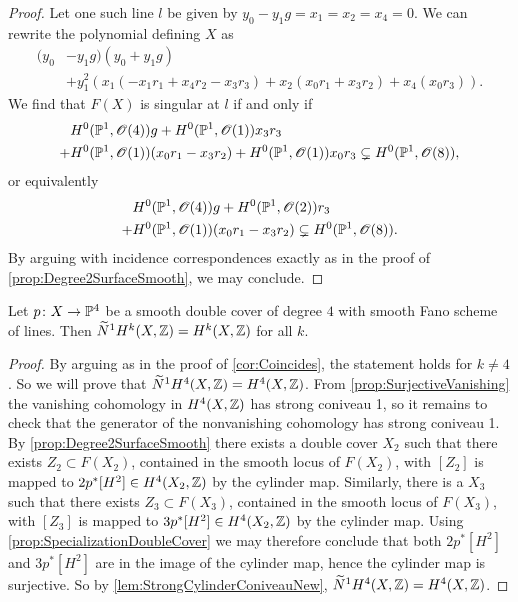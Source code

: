 \begin{proof}
Let one such line $l$ be given by
$y_0-y_1g=x_1 = x_2 = x_4= 0$. We can rewrite the polynomial defining $X$ as
\begin{equation}
  \label{eq:CubicScroll2DoubleCover}
  \begin{split}
(y_0&- y_1g)(y_0 + y_1g)
 \\ &+y_1^2\left(x_1(-x_1r_1 + x_4r_2 - x_3r_3)
+ x_2(x_0r_1 + x_3r_2) 
+ x_4(x_0 r_3)\right). 
  \end{split}
\end{equation}
We find that $F(X)$ is singular at $l$ if and only if
\begin{equation}
  \begin{split}
&H^0(\mathbb{P}^1,\mathscr{O}(4))g + H^0(\mathbb{P}^1,\mathscr{O}(1))x_3r_3\\
+&H^0(\mathbb{P}^1,\mathscr{O}(1))(x_0r_1 - x_3r_2)+H^0(\mathbb{P}^1,\mathscr{O}(1))x_0r_3  \subsetneq H^0(\mathbb{P}^1,\mathscr{O}(8)),\\
  \end{split}
\end{equation}
or equivalently
\begin{equation}
  \label{eq:CubicScroll3DoubleCover}
  \begin{split}
&H^0(\mathbb{P}^1,\mathscr{O}(4))g + H^0(\mathbb{P}^1,\mathscr{O}(2))r_3\\
+ &H^0(\mathbb{P}^1,\mathscr{O}(1))(x_0r_1 - x_3r_2)  \subsetneq H^0(\mathbb{P}^1,\mathscr{O}(8)).
\end{split}
\end{equation}
By arguing with incidence correspondences exactly as in the proof of \cref{prop:Degree2SurfaceSmooth}, we may conclude.
\end{proof}

\begin{theorem}
\label{thm:Degree4Fourfolds}
  Let $p \colon X \to \mathbb{P}^4$ be a smooth double cover of degree $4$ with smooth Fano scheme of lines. Then $\widetilde{N}^1H^k(X,\mathbb{Z}) = H^k(X,\mathbb{Z})$ for all $k$.
\end{theorem}
\begin{proof}
By arguing as in the proof of \cref{cor:Coincides}, the statement holds for $k \neq 4$. So we will prove that $\widetilde{N}^1H^4(X,\mathbb{Z}) = H^4(X,\mathbb{Z})$. From \cref{prop:SurjectiveVanishing} the vanishing cohomology in $H^4(X,\mathbb{Z})$ has strong coniveau 1, so it remains to check that the generator of the nonvanishing cohomology has strong coniveau 1. By \cref{prop:Degree2SurfaceSmooth} there exists a double cover $X_2$ such that 
there exists $Z_2 \subset F(X_2)$, contained in the smooth locus of $F(X_2)$, with $[Z_2]$ is mapped to $2p^*[H^2] \in H^4(X_2,\mathbb{Z})$ by the cylinder map. Similarly, there is a $X_3$ such that there exists $Z_3 \subset F(X_3)$, contained in the smooth locus of $F(X_3)$, with $[Z_3]$ is mapped to $3p^*[H^2] \in H^4(X_2,\mathbb{Z})$ by the cylinder map. Using \cref{prop:SpecializationDoubleCover} we may therefore conclude that both $2p^*[H^2]$ and $3p^*[H^2]$ are in the image of the cylinder map, hence the cylinder map is surjective. So by \cref{lem:StrongCylinderConiveauNew}, $\widetilde{N}^1H^4(X,\mathbb{Z}) = H^4(X,\mathbb{Z})$.
\end{proof}

